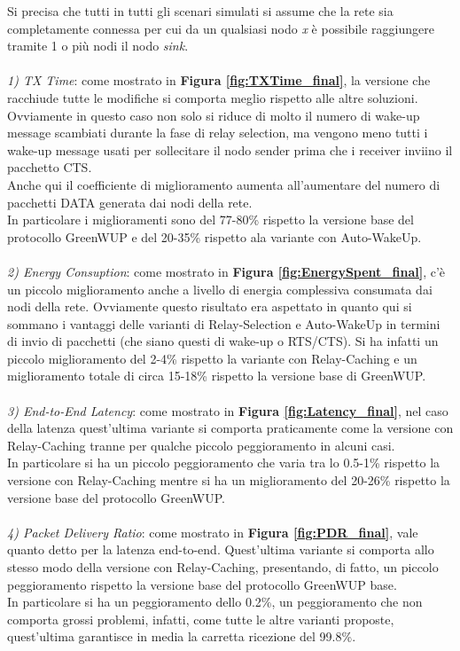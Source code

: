 Si precisa che tutti in tutti gli scenari simulati si assume che la rete sia completamente connessa per cui da un qualsiasi nodo \textit{x} è possibile raggiungere tramite 1 o più nodi il nodo \textit{sink}.
\\\\
\textit{1) TX Time}: come mostrato in \textbf{Figura \ref{fig:TXTime_final}}, la versione che racchiude tutte le modifiche si comporta meglio rispetto alle altre soluzioni. Ovviamente in questo caso non solo si riduce di molto il numero di wake-up message scambiati durante la fase di relay selection, ma vengono meno tutti i wake-up message usati per sollecitare il nodo sender prima che i receiver inviino il pacchetto CTS.\\
Anche qui il coefficiente di miglioramento aumenta all'aumentare del numero di pacchetti DATA generata dai nodi della rete.\\
In particolare i miglioramenti sono del 77-80\% rispetto la versione base del protocollo GreenWUP e del 20-35\% rispetto ala variante con Auto-WakeUp.
\\\\
\textit{2) Energy Consuption}: come mostrato in \textbf{Figura \ref{fig:EnergySpent_final}}, c'è un piccolo miglioramento anche a livello di energia complessiva consumata dai nodi della rete. Ovviamente questo risultato era aspettato in quanto qui si sommano i vantaggi delle varianti di Relay-Selection e Auto-WakeUp in termini di invio di pacchetti (che siano questi di wake-up o RTS/CTS). Si ha infatti un piccolo miglioramento del 2-4\% rispetto la variante con Relay-Caching e un miglioramento totale di circa 15-18\% rispetto la versione base di GreenWUP.
\\\\
\textit{3) End-to-End Latency}: come mostrato in \textbf{Figura \ref{fig:Latency_final}}, nel caso della latenza quest'ultima variante si comporta praticamente come la versione con Relay-Caching tranne per qualche piccolo peggioramento in alcuni casi. \\
In particolare si ha un piccolo peggioramento che varia tra lo 0.5-1\% rispetto la versione con Relay-Caching mentre si ha un miglioramento del 20-26\% rispetto la versione base del protocollo GreenWUP. 
\\\\
\textit{4) Packet Delivery Ratio}: come mostrato in \textbf{Figura \ref{fig:PDR_final}}, vale quanto detto per la latenza end-to-end. Quest'ultima variante si comporta allo stesso modo della versione con Relay-Caching, presentando, di fatto, un piccolo peggioramento rispetto la versione base del protocollo GreenWUP base.\\
In particolare si ha un peggioramento dello 0.2\%, un peggioramento che non comporta grossi problemi, infatti, come tutte le altre varianti proposte, quest'ultima garantisce in media la carretta ricezione del 99.8\%.

